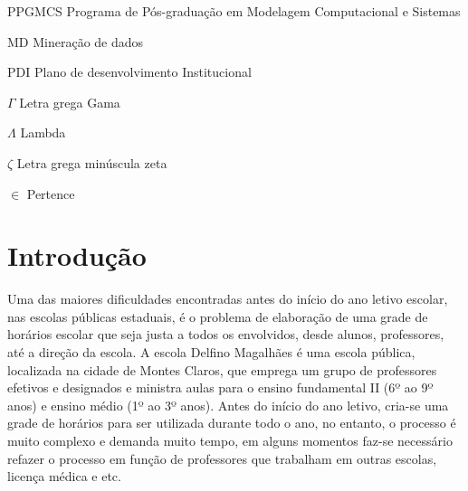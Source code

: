 \documentclass[
	12pt,				%
	openright,			%
	oneside,			%
	a4paper,			%
	english,			%
	french,				%
	spanish,			%
	brazil				%
	]{unimontes-ppgmsc-abntex2}
\begin{document}
\begin{siglas}
  \item[PPGMCS] Programa de Pós-graduação em Modelagem Computacional e Sistemas
  \item[MD] Mineração de dados
  \item[PDI] Plano de desenvolvimento Institucional
\end{siglas}

\begin{simbolos}
  \item[$ \Gamma $] Letra grega Gama
  \item[$ \Lambda $] Lambda
  \item[$ \zeta $] Letra grega minúscula zeta
  \item[$ \in $] Pertence
\end{simbolos}

\tableofcontents*
\cleardoublepage



%
\textual

\chapter{Introdução}
Uma das maiores dificuldades encontradas antes do início do ano letivo escolar, nas escolas públicas estaduais, é o problema de elaboração de uma grade de horários escolar que seja justa a todos os envolvidos, desde alunos, professores, até a direção da escola. A escola Delfino Magalhães é uma escola pública, localizada na cidade de Montes Claros, que emprega um grupo de professores efetivos e designados e ministra aulas para o ensino fundamental II (6º ao 9º anos) e ensino médio (1º ao 3º anos). Antes do início do ano letivo, cria-se uma grade de horários para ser utilizada durante todo o ano, no entanto, o processo é muito complexo e demanda muito tempo, em alguns momentos faz-se necessário refazer o processo em função de professores que trabalham em outras escolas, licença médica e etc.
\end{document}
